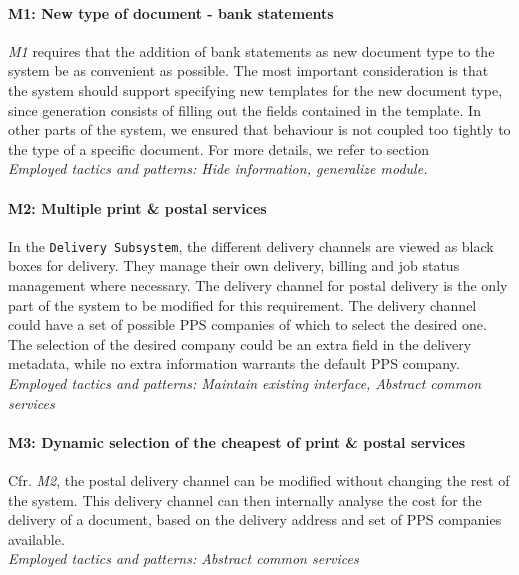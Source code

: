 \paragraph{M1\@: New type of document - bank statements} \emph{M1} requires that the addition of bank statements as new document type to the system be as convenient as possible. The most important consideration is that the system should support specifying new templates for the new document type, since generation consists of filling out the fields contained in the template. In other parts of the system, we ensured that behaviour is not coupled too tightly to the type of a specific document. For more details, we refer to section \\
\emph{Employed tactics and patterns: Hide information, generalize module.}
    
\paragraph{M2\@: Multiple print \& postal services} 
In the \texttt{Delivery Subsystem}, the different delivery channels are viewed as black boxes for delivery. They manage their own delivery, billing and job status management where necessary. The delivery channel for postal delivery is the only part of the system to be modified for this requirement. The delivery channel could have a set of possible PPS companies of which to select the desired one. The selection of the desired company could be an extra field in the delivery metadata, while no extra information warrants the default PPS company.\\
\emph{Employed tactics and patterns: Maintain existing interface, Abstract common services}
    
\paragraph{M3\@: Dynamic selection of the cheapest of print \& postal services}
Cfr. \emph{M2}, the postal delivery channel can be modified without changing the rest of the system. This delivery channel can then internally analyse the cost for the delivery of a document, based on the delivery address and set of PPS companies available.\\
\emph{Employed tactics and patterns: Abstract common services}

